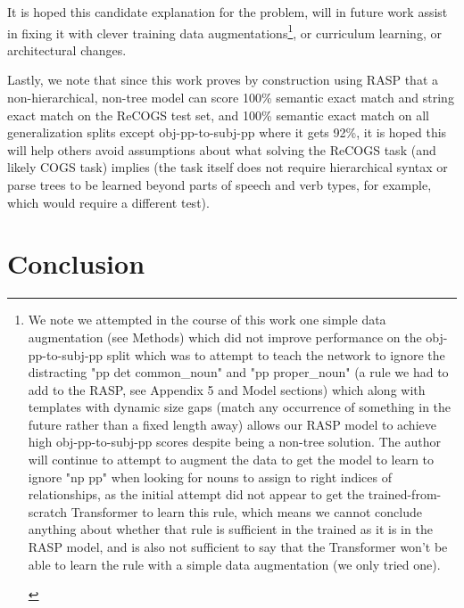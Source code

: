 \documentclass[11pt]{article}
\begin{document}
It is hoped this candidate explanation for the problem, will in future work assist in fixing it with clever training data augmentations\footnote{
\begin{tiny}
We note we attempted in the course of this work one simple data augmentation (see Methods) which did not improve performance on the obj-pp-to-subj-pp split which was to attempt to teach the network to ignore the distracting "pp det common\_noun" and "pp proper\_noun" (a rule we had to add to the RASP, see Appendix 5 and Model sections) which along with templates with dynamic size gaps (match any occurrence of something in the future rather than a fixed length away) allows our RASP model to achieve high obj-pp-to-subj-pp scores despite being a non-tree solution. The author will continue to attempt to augment the data to get the model to learn to ignore "np pp" when looking for nouns to assign to right indices of relationships, as the initial attempt did not appear to get the trained-from-scratch Transformer to learn this rule, which means we cannot conclude anything about whether that rule is sufficient in the trained as it is in the RASP model, and is also not sufficient to say that the Transformer won't be able to learn the rule with a simple data augmentation (we only tried one).
\end{tiny}
}, or curriculum learning, or architectural changes. 

Lastly, we note that since this work proves by construction using RASP that a non-hierarchical, non-tree model can score 100\% semantic exact match and string exact match on the ReCOGS test set, and 100\% semantic exact match on all generalization splits except obj-pp-to-subj-pp where it gets 92\%, it is hoped this will help others avoid assumptions about what solving the ReCOGS task (and likely COGS task) implies (the task itself does not require hierarchical syntax or parse trees to be learned beyond parts of speech and verb types, for example, which would require a different test).

\section{Conclusion} 
\end{document}
